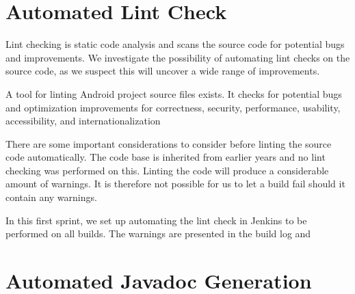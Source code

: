 \section{Automated Lint Check}\label{sec:automated_lint}
Lint checking is static code analysis and scans the source code for potential bugs and improvements. We investigate the possibility of automating lint checks on the source code, as we suspect this will uncover a wide range of improvements.

A tool for linting Android project source files exists. It checks for potential bugs and optimization improvements for correctness, security, performance, usability, accessibility, and internationalization 

There are some important considerations to consider before linting the source code automatically. The code base is inherited from earlier years and no lint checking was performed on this. Linting the code will produce a considerable amount of warnings. It is therefore not possible for us to let a build fail should it contain any warnings.

In this first sprint, we set up automating the lint check in Jenkins to be performed on all builds. The warnings are presented in the build log and 



\section{Automated Javadoc Generation}\label{sec:automated_documentation_gen}
